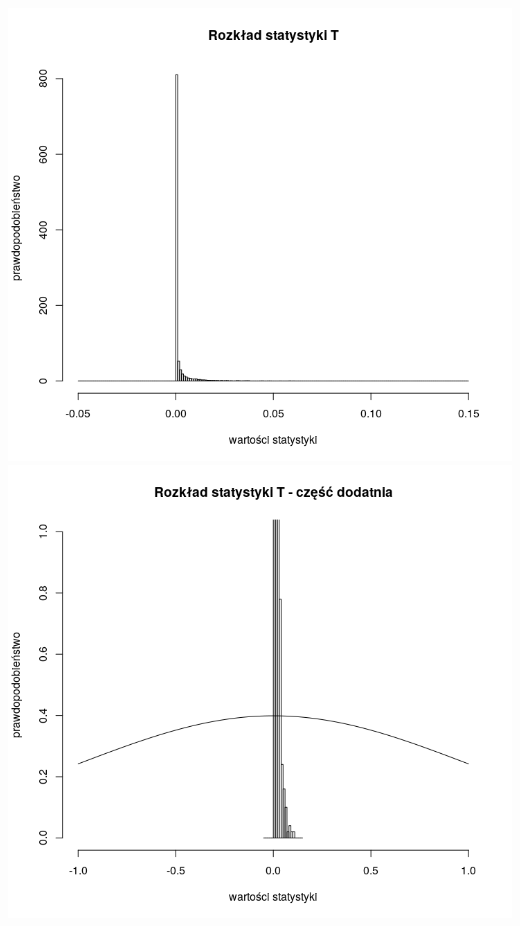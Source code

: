 \documentclass[a4paper,11pt]{article}
\begin{document}
\includegraphics[scale=.3]{Rplot100.png} 
\includegraphics[scale=.3]{Rplot101.png} 
\end{document}
